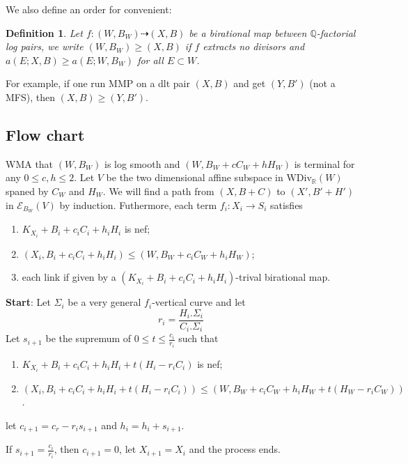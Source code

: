 \documentclass{article}
\newtheorem{defn}{Definition}[section]
\begin{document}
We also define an order for convenient:
\begin{defn}
Let $ f:(W,B_W)\dashrightarrow (X,B) $ be a birational map between $ \mathbb{Q} $-factorial log pairs, we write $ (W,B_W)\geqslant (X,B) $ if $ f $ extracts no divisors and $ a(E;X,B)\geqslant a(E;W,B_W) $ for all $ E\subset W $.
\end{defn}
For example, if one run MMP on a dlt pair $ (X,B) $ and get $ (Y,B') $ (not a MFS), then $ (X,B)\geqslant (Y,B') $.
\subsection{Flow chart}
WMA that $ (W,B_W) $ is log smooth and $ (W,B_W+cC_W+hH_W) $ is terminal for any $ 0\leqslant c,h \leqslant 2 $.  Let $ V $ be the two dimensional affine subspace in $ \mathrm{WDiv}_\mathbb{R}(W) $ spaned by $ C_W $ and $ H_W $. We will find a path from $ (X,B+C) $ to $ (X',B'+H') $ in $ \mathcal{E}_{B_W}(V) $ by induction. Futhermore, each term $ f_i:X_i\to S_i $ satisfies
\begin{enumerate}
\item $ K_{X_i}+B_i+c_iC_i+h_iH_i $ is nef;
\item $ (X_i,B_i+c_iC_i+h_iH_i) \leqslant (W,B_W+c_iC_W+h_iH_W) $;
\item each link if given by a $ (K_{X_i}+B_i+c_iC_i+h_iH_i ) $-trival birational map.
\end{enumerate}
\textbf{Start}:
Let $ \Sigma_i $ be a very general $ f_i $-vertical curve and let
$$ r_i=\frac{H_i.\Sigma_i}{C_i.\Sigma_i} $$
Let $ s_{i+1} $ be the supremum of $ 0\leqslant t\leqslant \frac{c_i}{r_i} $ such that
\begin{enumerate}
\item $ K_{X_i}+B_i+c_iC_i+h_iH_i +t(H_i-r_iC_i)$ is nef;
\item $ (X_i,B_i+c_iC_i+h_iH_i+t(H_i-r_iC_i)) \leqslant (W,B_W+c_iC_W+h_iH_W+t(H_W-r_iC_W)) $.
\end{enumerate}
let $ c_{i+1}=c_r-r_i s_{i+1}$ and $ h_{i}=h_i+s_{i+1} $.

If $ s_{i+1}=\frac{c_i}{r_i} $, then $ c_{i+1}=0 $, let $ X_{i+1}=X_i $ and the process ends.
\end{document}
